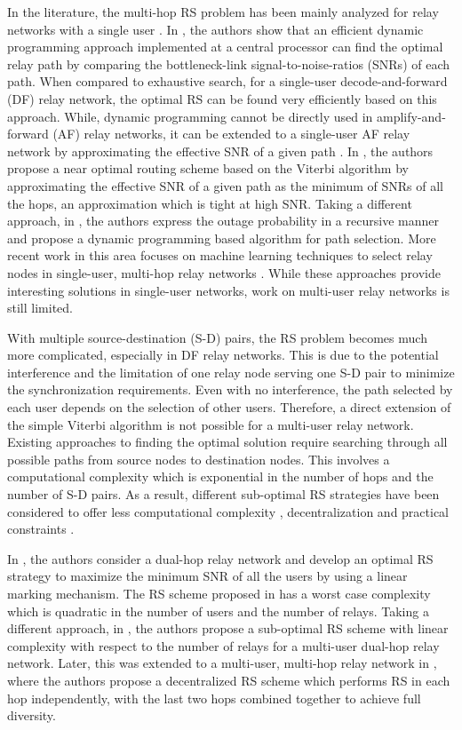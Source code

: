 \documentclass[12pt,draftclsnofoot,onecolumn]{IEEEtran}
\begin{document}
	In the literature, the multi-hop RS problem has been mainly analyzed for relay networks with a single user \cite{5982498,6364160,130145}. In \cite{5982498}, the authors show that an efficient dynamic programming approach implemented at a central processor can find the optimal relay path by comparing the bottleneck-link signal-to-noise-ratios (SNRs) of each path. When compared to exhaustive search, for a single-user decode-and-forward (DF) relay network, the optimal RS can be found very efficiently based on this approach. While, dynamic programming cannot be directly used in amplify-and-forward (AF) relay networks, it can be extended to a single-user AF relay network by approximating the effective SNR of a given path \cite{6364160,130145}. In \cite{6364160}, the authors propose a near optimal routing scheme based on the Viterbi algorithm by approximating the effective SNR of a given path as the minimum of SNRs of all the hops, an approximation which is tight at high SNR. Taking a different approach, in \cite{130145}, the authors express the outage probability in a recursive manner and propose a dynamic programming based algorithm for path selection. More recent work in this area focuses on machine learning techniques to select relay nodes in single-user, multi-hop relay networks \cite{electronics8090949,e23101310,2941932}. While these approaches provide interesting solutions in single-user networks, work on multi-user relay networks is still limited.
	
	With multiple source-destination (S-D) pairs, the RS problem becomes much more complicated, especially in DF relay networks. This is due to the potential interference and the limitation of one relay node serving one S-D pair to minimize the synchronization requirements. Even with no interference, the path selected by each user depends on the selection of other users. Therefore, a direct extension of the simple Viterbi algorithm is not possible for a multi-user relay network. Existing approaches to finding the optimal solution require searching through all possible paths from source nodes to destination nodes. This involves a computational complexity which is exponential in the number of hops and the number of S-D pairs. As a result, different sub-optimal RS strategies have been considered to offer less computational complexity \cite{130815}, decentralization \cite{2809748,3020299} and practical constraints \cite{s18103263}.
	
	In \cite{2091148}, the authors consider a dual-hop relay network and develop an optimal RS strategy to maximize the minimum SNR of all the users by using a linear marking mechanism. The RS scheme proposed in \cite{2091148} has a worst case complexity which is quadratic in the number of users and the number of relays. Taking a different approach, in \cite{130815}, the authors propose a sub-optimal RS scheme with linear complexity with respect to the number of relays for a multi-user dual-hop relay network. Later, this was extended to a multi-user, multi-hop relay network in \cite{2809748}, where the authors propose a decentralized RS scheme which performs RS in each hop independently, with the last two hops combined together to achieve full diversity. 
	
\end{document}
